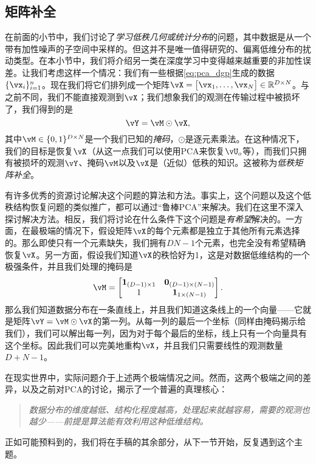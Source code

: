 \documentclass[../../book-main_zh.tex]{subfiles}
\begin{document}
\subsection{矩阵补全}

在前面的小节中，我们讨论了\textit{学习低秩几何或统计分布}的问题，其中数据是从一个带有加性噪声的子空间中采样的。但这并不是唯一值得研究的、偏离低维分布的扰动类型。在本小节中，我们将介绍另一类在深度学习中变得越来越重要的非加性误差。让我们考虑这样一个情况：我们有一些根据\eqref{eq:pca_dgp}生成的数据\(\{\vx_{i}\}_{i = 1}^{n}\)。现在我们将它们排列成一个矩阵\(\vX = \mat{\vx_{1}, \dots, \vx_{N}} \in \R^{D \times N}\)。与之前不同，我们不能直接观测到\(\vX\)；我们想象我们的观测在传输过程中被损坏了，我们得到的是
\begin{equation}
    \vY = \vM \odot \vX,
\end{equation}
其中\(\vM \in \{0, 1\}^{D \times N}\)是一个我们已知的\textit{掩码}，\(\odot\)是逐元素乘法。在这种情况下，我们的目标是恢复\(\vX\)（从这一点我们可以使用PCA来恢复\(\vU_{o}\)等），而我们只拥有被损坏的观测\(\vY\)、掩码\(\vM\)以及\(\vX\)是（近似）低秩的知识。这被称为\textit{低秩矩阵补全}。

有许多优秀的资源讨论解决这个问题的算法和方法\cite{Wright-Ma-2022}。事实上，这个问题以及这个低秩结构恢复问题的类似推广，都可以通过“鲁棒PCA”来解决。我们在这里不深入探讨解决方法。相反，我们将讨论在什么条件下这个问题是\textit{有希望}解决的。一方面，在最极端的情况下，假设矩阵\(\vX\)的每个元素都是独立于其他所有元素选择的。那么即使只有一个元素缺失，我们拥有\(DN - 1\)个元素，也完全没有希望精确恢复\(\vX\)。另一方面，假设我们知道\(\vX\)的秩恰好为1，这是对数据低维结构的一个极强条件，并且我们处理的掩码是
\begin{equation}
    \vM = \mat{\vone_{(D - 1) \times 1} & \vzero_{(D - 1) \times (N - 1)} \\ 1 & \vone_{1 \times (N - 1)} }.
\end{equation}
那么我们知道数据分布在一条直线上，并且我们知道这条线上的一个向量——它就是矩阵\(\vY = \vM \odot \vX\)的第一列。从每一列的最后一个坐标（同样由掩码揭示给我们），我们可以解出每一列，因为对于每个最后的坐标，线上只有一个向量具有这个坐标。因此我们可以完美地重构\(\vX\)，并且我们只需要线性的观测数量\(D + N - 1\)。

在现实世界中，实际问题介于上述两个极端情况之间。然而，这两个极端之间的差异，以及之前对PCA的讨论，揭示了一个普遍的真理核心：
\begin{quote}
    \centering
    \textit{数据分布的维度越低、结构化程度越高，处理起来就越容易，需要的观测也越少——前提是算法能有效利用这种低维结构。}
\end{quote}
正如可能预料到的，我们将在手稿的其余部分，从下一节开始，反复遇到这个主题。
\end{document}
